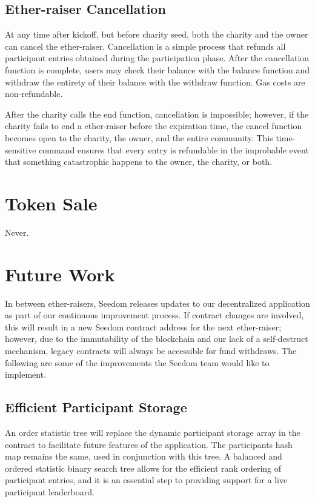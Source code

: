 \documentclass[11pt]{article}
\begin{document}
\subsection{Ether-raiser Cancellation}

At any time after kickoff, but before charity seed, both the charity and the owner can cancel the ether-raiser. Cancellation is a simple process that refunds all participant entries obtained during the participation phase. After the cancellation function is complete, users may check their balance with the balance function and withdraw the entirety of their balance with the withdraw function. Gas costs are non-refundable.

After the charity calls the end function, cancellation is impossible; however, if the charity fails to end a ether-raiser before the expiration time, the cancel function becomes open to the charity, the owner, and the entire community. This time-sensitive command ensures that every entry is refundable in the improbable event that something catastrophic happens to the owner, the charity, or both.

\section{Token Sale}
Never.

\section{Future Work}

In between ether-raisers, Seedom releases updates to our decentralized application as part of our continuous improvement process. If contract changes are involved, this will result in a new Seedom contract address for the next ether-raiser; however, due to the immutability of the blockchain and our lack of a self-destruct mechanism, legacy contracts will always be accessible for fund withdraws. The following are some of the improvements the Seedom team would like to implement.

\subsection{Efficient Participant Storage}

An order statistic tree \cite{5} will replace the dynamic participant storage array in the contract to facilitate future features of the application. The participants hash map remains the same, used in conjunction with this tree. A balanced and ordered statistic binary search tree allows for the efficient rank ordering of participant entries, and it is an essential step to providing support for a live participant leaderboard.
\end{document}
